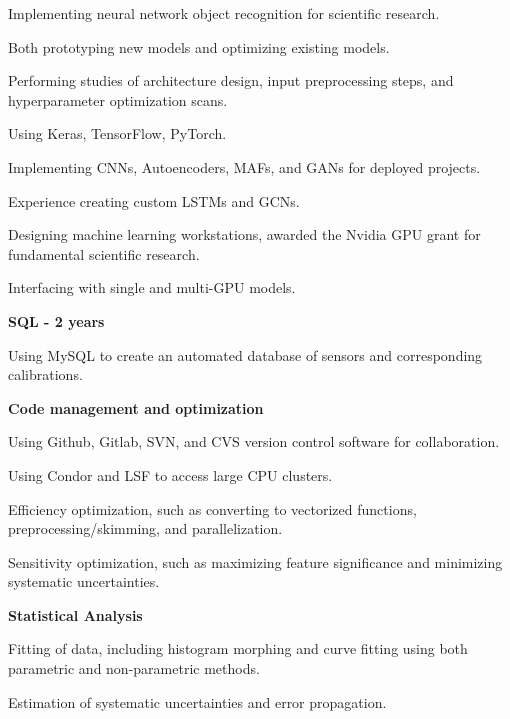 \documentclass[12pt]{article}
\begin{document}
\begin{newitemize2}
\item Implementing neural network object recognition for scientific research.
\item Both prototyping new models and optimizing existing models.
\item Performing studies of architecture design, input preprocessing steps, and hyperparameter optimization scans.
\item Using Keras, TensorFlow, PyTorch.
\item Implementing CNNs, Autoencoders, MAFs, and GANs for deployed projects.
\item Experience creating custom LSTMs and GCNs.
\item Designing machine learning workstations, awarded the Nvidia GPU grant for fundamental scientific research.
\item Interfacing with single and multi-GPU models.\\
\end{newitemize2}
\textbf{\hspace*{0.2cm}SQL - 2 years}
\begin{newitemize2}
\item Using MySQL to create an automated database of sensors and corresponding calibrations.\\
\end{newitemize2}
\textbf{\hspace*{0.2cm}Code management and optimization}
\begin{newitemize2}
 \item Using Github, Gitlab, SVN, and CVS version control software for collaboration.
 \item Using Condor and LSF to access large CPU clusters.
 \item Efficiency optimization, such as converting to vectorized functions, preprocessing/skimming, and parallelization.
 \item Sensitivity optimization, such as maximizing feature significance and minimizing systematic uncertainties.\\
\end{newitemize2}
\textbf{\hspace*{0.2cm}Statistical Analysis}
\begin{newitemize2}
\item Fitting of data, including histogram morphing and curve fitting using both parametric and non-parametric methods.
\item Estimation of systematic uncertainties and error propagation.\\
\end{newitemize2}
\end{document}
